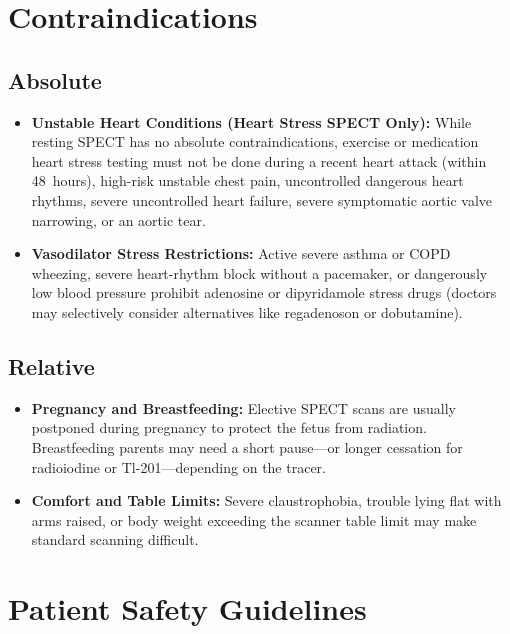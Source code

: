 \section{Contraindications}

\subsection{Absolute}

\begin{itemize}
    \item \textbf{Unstable Heart Conditions (Heart Stress SPECT Only):} While resting SPECT has no absolute contraindications, exercise or medication heart stress testing must not be done during a recent heart attack (within 48~hours), high-risk unstable chest pain, uncontrolled dangerous heart rhythms, severe uncontrolled heart failure, severe symptomatic aortic valve narrowing, or an aortic tear.
    \item \textbf{Vasodilator Stress Restrictions:} Active severe asthma or COPD wheezing, severe heart-rhythm block without a pacemaker, or dangerously low blood pressure prohibit adenosine or dipyridamole stress drugs (doctors may selectively consider alternatives like regadenoson or dobutamine).
\end{itemize}

\subsection{Relative}

\begin{itemize}
    \item \textbf{Pregnancy and Breastfeeding:} Elective SPECT scans are usually postponed during pregnancy to protect the fetus from radiation. Breastfeeding parents may need a short pause---or longer cessation for radioiodine or Tl-201---depending on the tracer.
    \item \textbf{Comfort and Table Limits:} Severe claustrophobia, trouble lying flat with arms raised, or body weight exceeding the scanner table limit may make standard scanning difficult.
\end{itemize}

\section{Patient Safety Guidelines}

